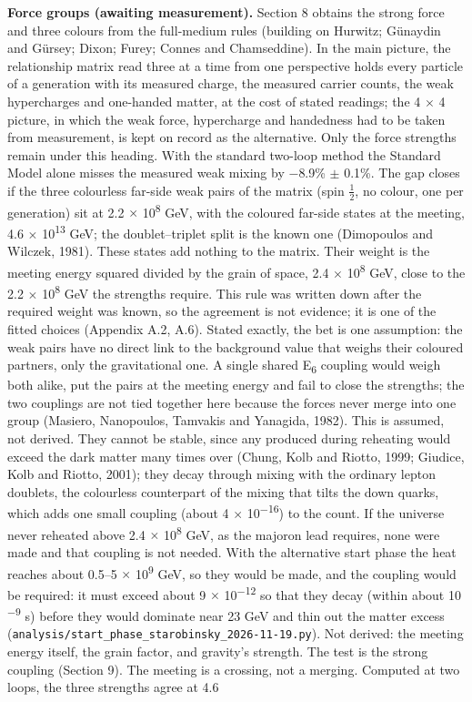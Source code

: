 \documentclass[
  11pt,
]{article}
\newcounter{none} %
\begin{document}
\textbf{Force groups (awaiting measurement).} Section 8 obtains the strong force and three colours from the full-medium rules (building on Hurwitz; Günaydin and Gürsey; Dixon; Furey; Connes and Chamseddine). In the main picture, the relationship matrix read three at a time from one perspective holds every particle of a generation with its measured charge, the measured carrier counts, the weak hypercharges and one-handed matter, at the cost of stated readings; the 4 \ensuremath{\times} 4 picture, in which the weak force, hypercharge and handedness had to be taken from measurement, is kept on record as the alternative. Only the force strengths remain under this heading. With the standard two-loop method the Standard Model alone misses the measured weak mixing by \ensuremath{-}8.9\% \ensuremath{\pm} 0.1\%. The gap closes if the three colourless far-side weak pairs of the matrix (spin \ensuremath{\frac{1}{2}}, no colour, one per generation) sit at 2.2 \ensuremath{\times} 10\textsuperscript{8} GeV, with the coloured far-side states at the meeting, 4.6 \ensuremath{\times} 10\textsuperscript{13} GeV; the doublet--triplet split is the known one (Dimopoulos and Wilczek, 1981). These states add nothing to the matrix. Their weight is the meeting energy squared divided by the grain of space, 2.4 \ensuremath{\times} 10\textsuperscript{8} GeV, close to the 2.2 \ensuremath{\times} 10\textsuperscript{8} GeV the strengths require. This rule was written down after the required weight was known, so the agreement is not evidence; it is one of the fitted choices (Appendix A.2, A.6). Stated exactly, the bet is one assumption: the weak pairs have no direct link to the background value that weighs their coloured partners, only the gravitational one. A single shared E\textsubscript{6} coupling would weigh both alike, put the pairs at the meeting energy and fail to close the strengths; the two couplings are not tied together here because the forces never merge into one group (Masiero, Nanopoulos, Tamvakis and Yanagida, 1982). This is assumed, not derived. They cannot be stable, since any produced during reheating would exceed the dark matter many times over (Chung, Kolb and Riotto, 1999; Giudice, Kolb and Riotto, 2001); they decay through mixing with the ordinary lepton doublets, the colourless counterpart of the mixing that tilts the down quarks, which adds one small coupling (about 4 \ensuremath{\times} 10\textsuperscript{\ensuremath{-}16}) to the count. If the universe never reheated above 2.4 \ensuremath{\times} 10\textsuperscript{8} GeV, as the majoron lead requires, none were made and that coupling is not needed. With the alternative start phase the heat reaches about 0.5--5 \ensuremath{\times} 10\textsuperscript{9} GeV, so they would be made, and the coupling would be required: it must exceed about 9 \ensuremath{\times} 10\textsuperscript{\ensuremath{-}12} so that they decay (within about 10\textsuperscript{\ensuremath{-}9} s) before they would dominate near 23 GeV and thin out the matter excess (\texttt{analysis/start\_phase\_starobinsky\_2026-11-19.py}). Not derived: the meeting energy itself, the grain factor, and gravity's strength. The test is the strong coupling (Section 9). The meeting is a crossing, not a merging. Computed at two loops, the three strengths agree at 4.6 
\end{document}
